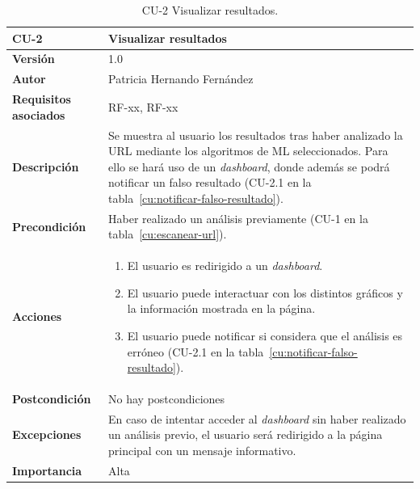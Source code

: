 \begin{table}[p]
	\centering
	\begin{tabularx}{\linewidth}{ p{} p{} }
		\toprule
		\textbf{CU-2}    & \textbf{Visualizar resultados}\\
		\toprule
		\textbf{Versión}              & 1.0    \\
		\textbf{Autor}                & Patricia Hernando Fernández \\
		\textbf{Requisitos asociados} & RF-xx, RF-xx \\
		\textbf{Descripción}          & Se muestra al usuario los resultados tras haber analizado la URL mediante los algoritmos de ML seleccionados. Para ello se hará uso de un \textit{dashboard}, donde además se podrá notificar un falso resultado (CU-2.1 en la tabla~\ref{cu:notificar-falso-resultado}).\\
		\textbf{Precondición}         & Haber realizado un análisis previamente (CU-1 en la tabla~\ref{cu:escanear-url}). \\
		\textbf{Acciones}             &
		\begin{enumerate}
			\def\labelenumi{\arabic{enumi}.}
			\tightlist
			\item El usuario es redirigido a un \textit{dashboard}.
			\item El usuario puede interactuar con los distintos gráficos y la información mostrada en la página.
			\item El usuario puede notificar si considera que el análisis es erróneo (CU-2.1 en la tabla~\ref{cu:notificar-falso-resultado}).
		\end{enumerate}\\
		\textbf{Postcondición}        & No hay postcondiciones \\
		\textbf{Excepciones}          & En caso de intentar acceder al \textit{dashboard} sin haber realizado un análisis previo, el usuario será redirigido a la página principal con un mensaje informativo.\\
		\textbf{Importancia}          & Alta \\
		\bottomrule
	\end{tabularx}
	\caption{CU-2 Visualizar resultados.}
	\label{cu:visualizar-resultados}
\end{table}


